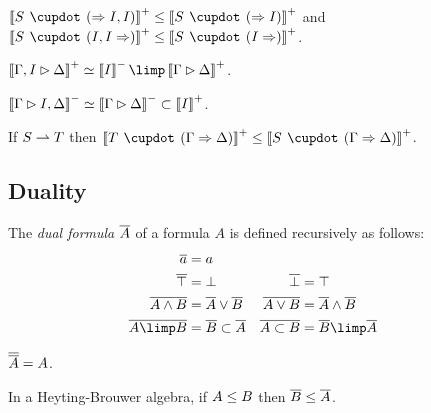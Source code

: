 \begin{lemma}[Contraction]
  $\psint{S \mix (\seq I, I)} \sement \psint{S \mix (\seq I)}$ and
  $\psint{S \mix (I, I \seq)} \sement \psint{S \mix (I \seq)}$.
\end{lemma}

\begin{lemma}[Currying]
  $\psint{\Gamma, I \J \Delta} \semequiv \nsint{I} \limp \psint{\Gamma \J
  \Delta}$.
\end{lemma}

\begin{lemma}[Co-currying]
  $\left\llbracket \Gamma \mathbin{\rhd} I, \Delta \right\rrbracket^- \simeq \left\llbracket \Gamma \mathbin{\rhd} \Delta \right\rrbracket^- \subset
  \left\llbracket I \right\rrbracket^+$.
\end{lemma}

\begin{lemma}
  
  If $S \rightharpoonup T$ then $\psint{T \mix (\Gamma \seq \Delta)} \sement \psint{S
  \mix (\Gamma \seq \Delta)}$.
\end{lemma}

\subsection{Duality}

\begin{definition}
  The \emph{dual formula} $\overline{A}$ of a formula $A$ is defined recursively
  as follows:
  \begin{align*}
    \soldual{a} &= a &\\
    \soldual{\top} &= \bot &
    \soldual{\bot} &= \top \\
    \soldual{A \land B} &= \soldual{A} \lor \soldual{B} &
    \soldual{A \lor B} &= \soldual{A} \land \soldual{B} \\
    \soldual{A \limp B} &= \soldual{B} \lsub \soldual{A} &
    \soldual{A \lsub B} &= \soldual{B} \limp \soldual{A}
  \end{align*}
\end{definition}

\begin{lemma}[Involutivity]
  $\overline{\overline{A}} = A$.
\end{lemma}

\begin{lemma}[Duality]
  In a Heyting-Brouwer algebra, if $A \leq B$ then $\overline{B} \leq
  \overline{A}$.
\end{lemma}


